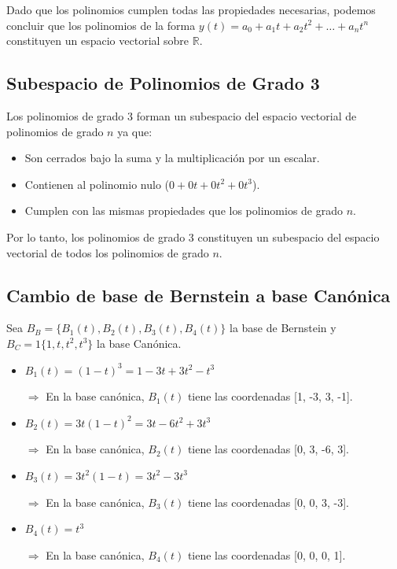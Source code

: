 \documentclass{article}
\begin{document}
Dado que los polinomios cumplen todas las propiedades necesarias, podemos concluir que los polinomios de la forma \( y(t) = a_0 + a_1 t + a_2 t^2 + \dots + a_n t^n \) constituyen un espacio vectorial sobre \(\mathbb{R}\).

\subsection*{Subespacio de Polinomios de Grado 3}
Los polinomios de grado 3 forman un subespacio del espacio vectorial de polinomios de grado \( n \) ya que:
\begin{itemize}
    \item Son cerrados bajo la suma y la multiplicación por un escalar.
    \item Contienen al polinomio nulo ($0+0t+0t^2+0t^3$).
    \item Cumplen con las mismas propiedades que los polinomios de grado \( n \).
\end{itemize}

Por lo tanto, los polinomios de grado 3 constituyen un subespacio del espacio vectorial de todos los polinomios de grado \( n \).

\subsection*{Cambio de base de Bernstein a base Canónica}
Sea $B_B = \{B_1(t), B_2(t), B_3(t), B_4(t)\}$ la base de Bernstein y $B_C = 1\{1, t, t^2, t^3\}$ la base Canónica.

\begin{itemize}
    \item $B_1(t) = (1-t)^3 = 1 - 3t + 3t^2 - t^3$

$\Rightarrow$  En la base canónica, $B_1(t)$ tiene las coordenadas [1, -3, 3, -1].
    \item $B_2(t) = 3t(1-t)^2 =3t - 6t^2 + 3t^3$

$\Rightarrow$  En la base canónica, $B_2(t)$ tiene las coordenadas [0, 3, -6, 3].

    \item $B_3(t) = 3t^2(1-t) =3t^2 - 3t^3$

$\Rightarrow$  En la base canónica, $B_3(t)$ tiene las coordenadas [0, 0, 3, -3].

    \item $B_4(t) = t^3$

$\Rightarrow$  En la base canónica, $B_4(t)$ tiene las coordenadas [0, 0, 0, 1].
\end{itemize}
\end{document}
